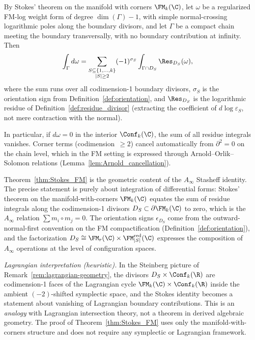 \begin{theorem}
\label{thm:Stokes_FM}
By Stokes' theorem on the manifold with corners $\FM_k(\C)$, let
$\omega$ be a regularized FM-log weight form of degree
$\dim(\Gamma)-1$, with simple normal-crossing logarithmic poles along
the boundary divisors, and let $\Gamma$ be a compact chain meeting the
boundary transversally, with no boundary contribution at infinity. Then
\[
\int_{\Gamma} d\omega = \sum_{\substack{S \subseteq \{1,\ldots,k\} \\ |S| \geq 2}} (-1)^{\sigma_S} \int_{\Gamma \cap D_S} \Res_{D_S}(\omega),
\]
where the sum runs over all codimension-1 boundary divisors, $\sigma_S$ is the orientation sign from Definition~\ref{def:orientation}, and $\Res_{D_S}$ is the logarithmic residue of Definition~\ref{def:residue_divisor} (extracting the coefficient of $d\log\varepsilon_S$, not mere contraction with the normal).

In particular, if $d\omega = 0$ in the interior $\Conf_k(\C)$, the sum of all residue integrals vanishes. Corner terms (codimension~$\geq 2$) cancel automatically from $\partial^2 = 0$ on the chain level, which in the FM setting is expressed through Arnold--Orlik--Solomon relations (Lemma~\ref{lem:Arnold_cancellation}).
\end{theorem}

\begin{remark}
\label{rem:stokes-lagrangian}
Theorem~\ref{thm:Stokes_FM} is the geometric content of the
$A_\infty$ Stasheff identity. The precise statement is purely
about integration of differential forms:
Stokes' theorem on the manifold-with-corners $\FM_k(\C)$ equates
the sum of residue integrals along the codimension-1 divisors
$D_S \subset \partial\FM_k(\C)$ to zero, which is the $A_\infty$
relation $\sum m_i \circ m_j = 0$. The orientation signs
$\epsilon_{D_S}$ come from the outward-normal-first convention on
the FM compactification (Definition~\ref{def:orientation}), and the
factorization $D_S \cong \FM_r(\C) \times \FM_{|S|}^{\mathrm{red}}(\C)$ expresses
the composition of $A_\infty$ operations at the level of
configuration spaces.

\smallskip
\noindent\emph{Lagrangian interpretation
\textup{(}heuristic\textup{)}.}
In the Steinberg picture of
Remark~\ref{rem:lagrangian-geometry}, the divisors
$D_S \times \Conf_k(\R)$ are codimension-1 faces of the
Lagrangian cycle $\FM_k(\C) \times \Conf_k(\R)$ inside the
ambient $(-2)$-shifted symplectic space, and the Stokes identity
becomes a statement about vanishing of Lagrangian boundary
contributions. This is an \emph{analogy} with Lagrangian
intersection theory, not a theorem in derived algebraic geometry.
The proof of Theorem~\ref{thm:Stokes_FM} uses only the
manifold-with-corners structure and does not require any
symplectic or Lagrangian framework.
\end{remark}

